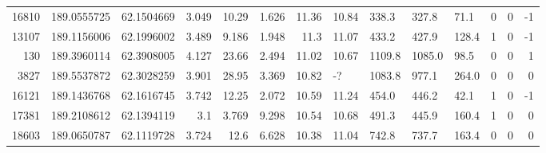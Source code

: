 \begin{tabular}{|r|r|r|r|r|r|r|l|l|l|l|r|r|r|}
  16810 & 189.0555725 & 62.1504669 & 3.049 & 10.29 & 1.626 & 11.36 & 10.84 & 338.3 & 327.8 & 71.1 & 0 & 0 & -1\\
  13107 & 189.1156006 & 62.1996002 & 3.489 & 9.186 & 1.948 & 11.3 & 11.07 & 433.2 & 427.9 & 128.4 & 1 & 0 & -1\\
  130 & 189.3960114 & 62.3908005 & 4.127 & 23.66 & 2.494 & 11.02 & 10.67 & 1109.8 & 1085.0 & 98.5 & 0 & 0 & 1\\
  3827 & 189.5537872 & 62.3028259 & 3.901 & 28.95 & 3.369 & 10.82 & -? & 1083.8 & 977.1 & 264.0 & 0 & 0 & 0\\
  16121 & 189.1436768 & 62.1616745 & 3.742 & 12.25 & 2.072 & 10.59 & 11.24 & 454.0 & 446.2 & 42.1 & 1 & 0 & -1\\
  17381 & 189.2108612 & 62.1394119 & 3.1 & 3.769 & 9.298 & 10.54 & 10.68 & 491.3 & 445.9 & 160.4 & 1 & 0 & 0\\
  18603 & 189.0650787 & 62.1119728 & 3.724 & 12.6 & 6.628 & 10.38 & 11.04 & 742.8 & 737.7 & 163.4 & 0 & 0 & 0\\
\hline\end{tabular}
